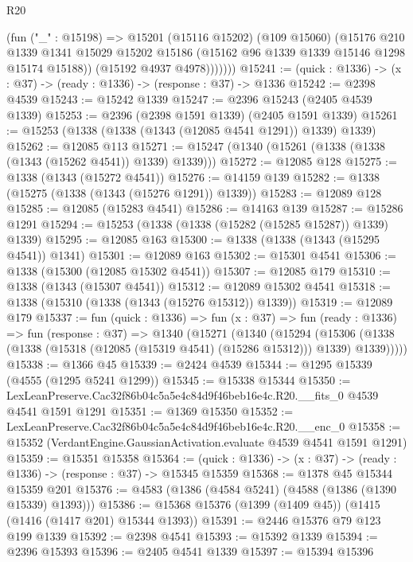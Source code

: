 \begin{lexlean}{R20}
\begin{coremodule}
              (fun ("_" : @15198) =>
              @15201
                (@15116 @15202)
                (@109 @15060)
                (@15176
                  @210
                  @1339
                  @1341
                  @15029
                  @15202
                  @15186
                  (@15162 @96 @1339 @1339 @15146 @1298 @15174 @15188))
                (@15192 @4937 @4978)))))))
@15241 := (quick : @1336) -> (x : @37) -> (ready : @1336) -> (response : @37) -> @1336
@15242 := @2398 @4539
@15243 := @15242 @1339
@15247 := @2396 @15243 (@2405 @4539 @1339)
@15253 := @2396 (@2398 @1591 @1339) (@2405 @1591 @1339)
@15261 := @15253 (@1338 (@1338 (@1343 (@12085 @4541 @1291)) @1339) @1339)
@15262 := @12085 @113
@15271 := @15247 (@1340 (@15261 (@1338 (@1338 (@1343 (@15262 @4541)) @1339) @1339)))
@15272 := @12085 @128
@15275 := @1338 (@1343 (@15272 @4541))
@15276 := @14159 @139
@15282 := @1338 (@15275 (@1338 (@1343 (@15276 @1291)) @1339))
@15283 := @12089 @128
@15285 := @12085 (@15283 @4541)
@15286 := @14163 @139
@15287 := @15286 @1291
@15294 := @15253 (@1338 (@1338 (@15282 (@15285 @15287)) @1339) @1339)
@15295 := @12085 @163
@15300 := @1338 (@1338 (@1343 (@15295 @4541)) @1341)
@15301 := @12089 @163
@15302 := @15301 @4541
@15306 := @1338 (@15300 (@12085 @15302 @4541))
@15307 := @12085 @179
@15310 := @1338 (@1343 (@15307 @4541))
@15312 := @12089 @15302 @4541
@15318 := @1338 (@15310 (@1338 (@1343 (@15276 @15312)) @1339))
@15319 := @12089 @179
@15337 := fun (quick : @1336) =>
  fun (x : @37) =>
  fun (ready : @1336) =>
  fun (response : @37) =>
  @1340
    (@15271
      (@1340
        (@15294
          (@15306 (@1338 (@1338 (@15318 (@12085 (@15319 @4541) (@15286 @15312))) @1339) @1339)))))
@15338 := @1366 @45
@15339 := @2424 @4539
@15344 := @1295 @15339 (@4555 (@1295 @5241 @1299))
@15345 := @15338 @15344
@15350 := LexLeanPreserve.Cac32f86b04c5a5e4c84d9f46beb16e4c.R20.__fits_0 @4539 @4541 @1591 @1291
@15351 := @1369 @15350
@15352 := LexLeanPreserve.Cac32f86b04c5a5e4c84d9f46beb16e4c.R20.__enc_0
@15358 := @15352 (VerdantEngine.GaussianActivation.evaluate @4539 @4541 @1591 @1291)
@15359 := @15351 @15358
@15364 := (quick : @1336) -> (x : @37) -> (ready : @1336) -> (response : @37) -> @15345 @15359
@15368 := @1378 @45 @15344 @15359 @201
@15376 := @4583 (@1386 (@4584 @5241) (@4588 (@1386 (@1390 @15339) @1393)))
@15386 := @15368 @15376 (@1399 (@1409 @45)) (@1415 (@1416 (@1417 @201) @15344 @1393))
@15391 := @2446 @15376 @79 @123 @199 @1339
@15392 := @2398 @4541
@15393 := @15392 @1339
@15394 := @2396 @15393
@15396 := @2405 @4541 @1339
@15397 := @15394 @15396

\end{coremodule}
\end{lexlean}
